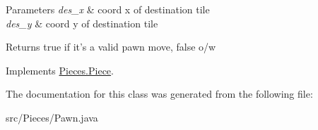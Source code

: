 \begin{DoxyParams}{Parameters}
{\em des\-\_\-x} & coord x of destination tile \\
\hline
{\em des\-\_\-y} & coord y of destination tile \\
\hline
\end{DoxyParams}
\begin{DoxyReturn}{Returns}
true if it's a valid pawn move, false o/w 
\end{DoxyReturn}


Implements \hyperlink{classMain_1_1Piece}{Pieces.\-Piece}.



The documentation for this class was generated from the following file\-:\begin{DoxyCompactItemize}
\item 
src/\-Pieces/Pawn.\-java\end{DoxyCompactItemize}
